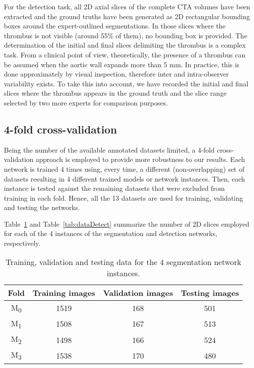 \documentclass[preprint,authoryear,12pt]{elsarticle}
\begin{document}
For the detection task, all 2D axial slices of the complete CTA volumes have been extracted and the ground truths have been generated as 2D rectangular bounding boxes around the expert-outlined segmentations. In those slices where the thrombus is not visible (around 55\% of them), no bounding box is provided. 
The determination of the initial and final slices delimiting the thrombus is a complex task. From a clinical point of view, theoretically, the presence of a thrombus can be assumed when the aortic wall expands more than 5 mm. In practice, this is done approximately by visual inspection, therefore inter and intra-observer variability exists. To take this into account, we have recorded the initial and final slices where the thrombus appears in the ground truth and the slice range selected by two more experts for comparison purposes. 

\subsection{4-fold cross-validation}
Being the number of the available annotated datasets limited, a 4-fold cross-validation approach is employed to provide more robustness to our results. Each network is trained 4 times using, every time, a different (non-overlapping) set of datasets resulting in 4 different trained models or network instances. Then, each instance is tested against the remaining datasets that were excluded from training in each fold. Hence, all the 13 datasets are used for training, validating and testing the networks.

Table~\ref{tab:data} and Table~\ref{tab:dataDetect} summarize the number of 2D slices employed for each of the 4 instances of the segmentation and detection networks, respectively.   

\begin{table}[htb]
\centering
\begin{tabular}{c|c|c|c}
\hline
Fold & Training images & Validation images & Testing images \\
\hline
M\textsubscript{0} & 1519 & 168 & 501  \\
M\textsubscript{1} & 1508 & 167 & 513  \\
M\textsubscript{2} & 1498 & 166 & 524  \\
M\textsubscript{3} & 1538 & 170 & 480
\end{tabular}
\caption{\label{tab:data}Training, validation and testing data for the 4 segmentation network instances.}
\end{table}
\end{document}
